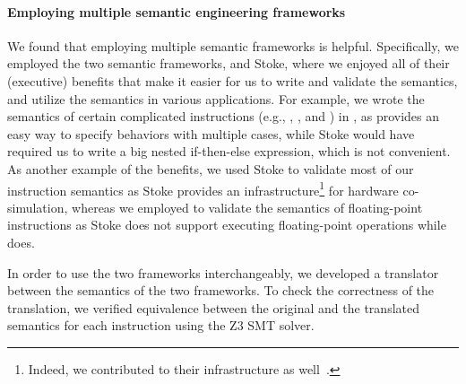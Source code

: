 
\paragraph{Employing multiple semantic engineering frameworks}

We found that employing multiple semantic frameworks is helpful. Specifically, we employed the two semantic frameworks, \K and Stoke, where we enjoyed all of their (executive) benefits that make it easier for us to write and validate the semantics, and utilize the semantics in various applications. For example, we wrote the semantics of certain complicated instructions (e.g., , , and ) in \K, as \K provides an easy way to specify behaviors with multiple cases, while Stoke would have required us to write a big nested if-then-else expression, which is not convenient. As another example of the benefits, we used Stoke to validate most of our instruction semantics
as Stoke provides an infrastructure\footnote{Indeed, we contributed to their infrastructure as well~\cite{completing-stock,improving-stoke}.} for hardware co-simulation, whereas we employed \K to validate the semantics of floating-point instructions as Stoke does not support executing floating-point operations while \K does.

In order to use the two frameworks interchangeably, we developed a translator between the semantics of the two frameworks. To check the correctness of the translation, we verified equivalence between the original and the translated semantics for each instruction using the Z3 SMT solver.

